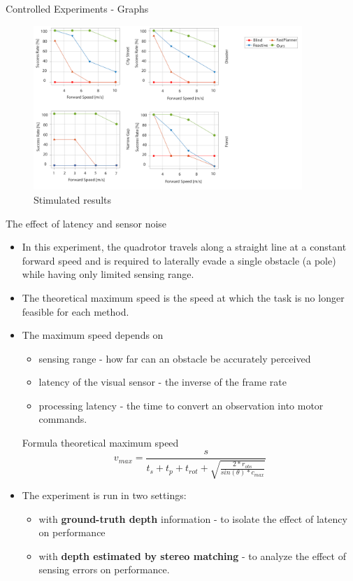 \documentclass{beamer}
\begin{document}
\begin{frame}{Controlled Experiments - Graphs}
	\begin{figure}
		\includegraphics[width=4in]{images/controlled-experiments.png}
		\caption{Stimulated results}
	\end{figure}
	
\end{frame}

\begin{frame}[allowframebreaks]{The effect of latency and sensor noise}
	\begin{itemize}
		\item In this experiment, the quadrotor travels along a straight line at a constant forward speed and is required to laterally evade a single obstacle (a pole) while having only limited sensing range.
		\item The theoretical maximum speed is the speed at which the task is no longer feasible for each method. 
		\item The maximum speed depends on 
		\begin{itemize}
			\item sensing range - how far can an obstacle be accurately perceived
			\item latency of the visual sensor - the inverse of the frame rate
			\item processing latency - the time to convert an observation into motor commands.
		\end{itemize} 
	
		\pagebreak
		
		\begin{block}{Formula}
			theoretical maximum speed
			\begin{equation}
				v_{max} = \frac{s}{t_s + t_p + t_{rot} + \sqrt{\frac{2*r_{obs}}{sin(\theta)*c_{max}}}}
			\end{equation}
		\end{block}
		\item The experiment is run in two settings:
		\begin{itemize}
			\item with \textbf{ground-truth depth} information - to isolate the effect of latency on performance
			\item with \textbf{depth estimated by stereo matching}\autocite{stereoMatching} - to analyze the effect of sensing errors on performance.
		\end{itemize}
	\end{itemize}
\end{frame}
\end{document}
